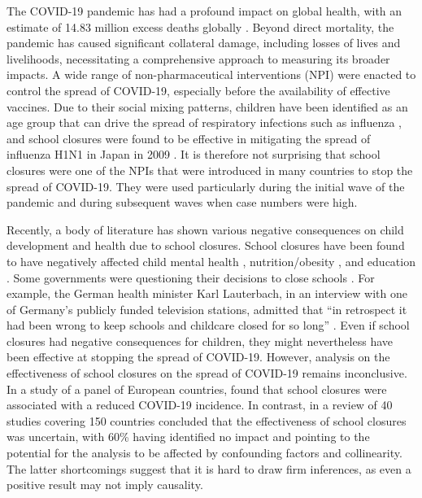 \documentclass[]{interact}
\theoremstyle{plain}%
\theoremstyle{definition}
\theoremstyle{remark}
\begin{document}
The COVID-19 pandemic has had a profound impact on global health, with an estimate of 14.83 million excess deaths globally \citep{msemburi2023estimates}. Beyond direct mortality, the pandemic has caused significant collateral damage, including losses of lives and livelihoods, necessitating a comprehensive approach to measuring its broader impacts. A wide range of non-pharmaceutical interventions (NPI) were enacted to control the spread of COVID-19, especially before the availability of effective vaccines. Due to their social mixing patterns, children have been identified as an age group that can drive the spread of respiratory infections such as influenza \citep{moser2018estimating}, and school closures were found to be effective in mitigating the spread of influenza H1N1 in Japan in 2009 \citep{kawano2015substantial}. It is therefore not surprising that school closures were one of the NPIs that were introduced in many countries to stop the spread of COVID-19. They were used particularly during the initial wave of the pandemic and during subsequent waves when case numbers were high.

Recently, a body of literature has shown various negative consequences on child development and health due to school closures. School closures have been found to have negatively affected child mental health \citep{moulin2022longitudinal}, nutrition/obesity \citep{sugimoto2023temporal}, and education \citep{lerkkanen2023reading}. Some governments were questioning their decisions to close schools \citep{de2021determines}. For example, the German health minister Karl Lauterbach, in an interview with one of Germany's publicly funded television stations, admitted that ``in retrospect it had been wrong to keep schools and childcare closed for so long'' \citep{ard2023lauterbach}. Even if school closures had negative consequences for children, they might nevertheless have been effective at stopping the spread of COVID-19. However, analysis on the effectiveness of school closures on the spread of COVID-19 remains inconclusive. In a study of a panel of European countries, \citet{alfano2022effects} found that school closures were associated with a reduced COVID-19 incidence. In contrast, \citet{walsh2021school} in a review of 40 studies covering 150 countries concluded that the effectiveness of school closures was uncertain, with 60\% having identified no impact and pointing to the potential for the analysis to be affected by confounding factors and collinearity. The latter shortcomings suggest that it is hard to draw firm inferences, as even a positive result may not imply causality.
\end{document}
